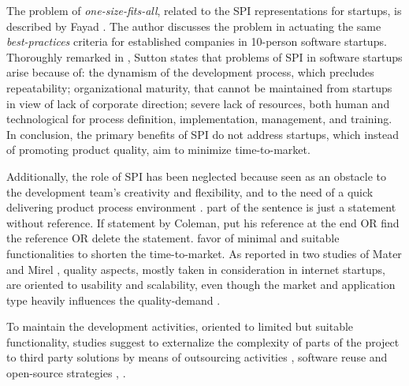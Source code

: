 \documentclass[12pt,journal,compsoc]{../sty/IEEEtran}
\begin{document}
The problem of \textit{one-size-fits-all}, related to the SPI  representations
for startups, is described by Fayad \cite{Fayad1997}. The author discusses the
problem in actuating the same \textit{best-practices} criteria for established
companies in 10-person software startups. Thoroughly remarked in
\cite{Sutton2000}, Sutton states that problems of SPI in software startups arise
because of: the dynamism of the development process, which precludes
repeatability; organizational maturity, that cannot be maintained from startups
in view of lack of corporate direction; severe lack of resources, both human and
technological for process definition, implementation, management, and training.
In conclusion, the primary benefits of SPI do not address startups, which
instead of promoting product quality, aim to minimize time-to-market.

Additionally, the role of SPI has been neglected because seen as an obstacle to
the development team's creativity and flexibility, and to  the need of a quick
delivering product process environment \cite{Coleman2008a}. %
part of the sentence is just a statement without reference. If  %
statement by Coleman, put his reference at the end OR find the  %
reference OR delete the statement. %
favor of minimal and suitable functionalities  to shorten the time-to-market. As
reported in two studies of Mater and Mirel  \cite{Mater2000, Mirel2000}, quality
aspects, mostly taken in consideration in  internet startups, are oriented to
usability and scalability, even though the  market and application type heavily
influences the quality-demand  \cite{Coleman2008, Kim2005}.

To maintain the development activities, oriented to limited but suitable
functionality, studies suggest to externalize the complexity of parts of the
project to third party solutions by means of outsourcing activities
\cite{Hanna2010}, software reuse \cite{Jansen2008} and open-source strategies ,
\cite{Wall2001, Bean2005}.  %
\end{document}
